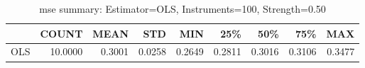\begin{table}[ht]
\centering
\caption{mse summary: Estimator=OLS, Instruments=100, Strength=0.50}
\begin{tabular}{lrrrrrrrr}
\toprule
 & COUNT & MEAN & STD & MIN & 25\% & 50\% & 75\% & MAX \\
\midrule
OLS & 10.0000 & 0.3001 & 0.0258 & 0.2649 & 0.2811 & 0.3016 & 0.3106 & 0.3477 \\
\bottomrule
\end{tabular}
\end{table}

